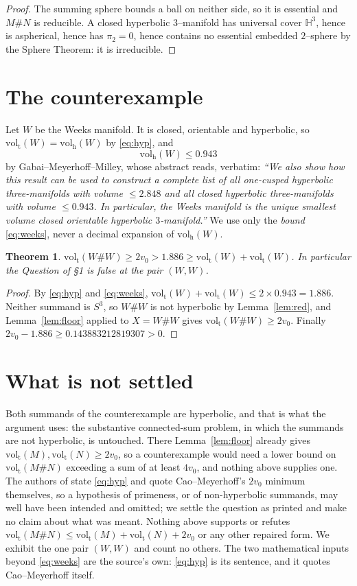 \documentclass[11pt]{amsart}
\newtheorem{theorem}{Theorem}
\theoremstyle{definition}
\theoremstyle{remark}
\newcommand{\volt}{\operatorname{vol_t}}
\newcommand{\volh}{\operatorname{vol_h}}
\newcommand{\HH}{\mathbb{H}}
\begin{document}
\begin{proof}
The summing sphere bounds a ball on neither side, so it is essential and $M\#N$ is
reducible. A closed hyperbolic $3$--manifold has universal cover $\HH^3$, hence is
aspherical, hence has $\pi_2=0$, hence contains no essential embedded $2$--sphere by the
Sphere Theorem: it is irreducible.
\end{proof}

\section{The counterexample}

Let $W$ be the Weeks manifold. It is closed, orientable and hyperbolic, so
$\volt(W)=\volh(W)$ by \eqref{eq:hyp}, and
\begin{equation}\label{eq:weeks}
  \volh(W)\le 0.943
\end{equation}
by Gabai--Meyerhoff--Milley, whose abstract reads, verbatim: \emph{``We also show how this
result can be used to construct a complete list of all one-cusped hyperbolic
three-manifolds with volume $\le 2.848$ and all closed hyperbolic three-manifolds with
volume $\le 0.943$. In particular, the Weeks manifold is the unique smallest volume closed
orientable hyperbolic $3$-manifold.''} We use only the \emph{bound} \eqref{eq:weeks}, never
a decimal expansion of $\volh(W)$.

\begin{theorem}\label{thm:A}
$\volt(W\# W)\ge 2v_0>1.886\ge\volt(W)+\volt(W)$. In particular the Question of \S1 is
false at the pair $(W,W)$.
\end{theorem}

\begin{proof}
By \eqref{eq:hyp} and \eqref{eq:weeks}, $\volt(W)+\volt(W)\le 2\times 0.943=1.886$. Neither
summand is $S^3$, so $W\# W$ is not hyperbolic by Lemma~\ref{lem:red}, and
Lemma~\ref{lem:floor} applied to $X=W\# W$ gives $\volt(W\# W)\ge 2v_0$. Finally
$2v_0-1.886\ge 0.143883212819307>0$.
\end{proof}

\section{What is not settled}

Both summands of the counterexample are hyperbolic, and that is what the argument uses: the
substantive connected-sum problem, in which the summands are not hyperbolic, is untouched.
There Lemma~\ref{lem:floor} already gives $\volt(M),\volt(N)\ge 2v_0$, so a counterexample
would need a lower bound on $\volt(M\# N)$ exceeding a sum of at least $4v_0$, and nothing
above supplies one. The authors of \cite{KRSTT} state \eqref{eq:hyp} and quote
Cao--Meyerhoff's $2v_0$ minimum themselves, so a hypothesis of primeness, or of
non-hyperbolic summands, may well have been intended and omitted; we settle the question as
printed and make no claim about what was meant. Nothing above supports or refutes
$\volt(M\#N)\le\volt(M)+\volt(N)+2v_0$ or any other repaired form. We exhibit the one pair
$(W,W)$ and count no others. The two mathematical inputs beyond \eqref{eq:weeks} are the
source's own: \eqref{eq:hyp} is its sentence, and it quotes Cao--Meyerhoff itself.
\end{document}
